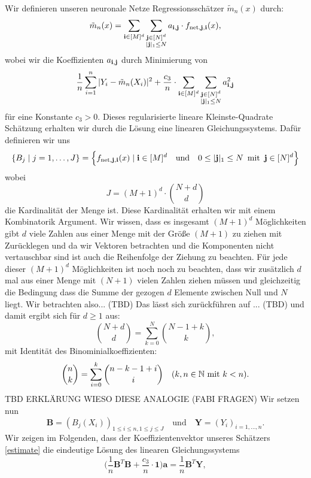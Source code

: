 Wir definieren unseren neuronale Netze Regressionsschätzer $\tilde{m}_n(x)$ durch$\colon$
\begin{equation}
\label{estimate}
\tilde{m}_n(x) = \sum_{\mathbf{i} \in [M]^d} \sum_{\substack{\mathbf{j} \in [N]^d\\|\mathbf{j}|_1 \leq N}} a_{\mathbf{i},\mathbf{j}} \cdot f_{\mathrm{net},\mathbf{j},\mathbf{i}}(x),
\end{equation}
wobei wir die Koeffizienten $a_{\mathbf{i},\mathbf{j}}$ durch Minimierung von 
\begin{equation}
\label{min} \frac{1}{n} \sum_{i = 1}^n|Y_i - \tilde{m}_n(X_i)|^2 + \frac{c_3}{n} \cdot \sum_{\mathbf{i} \in [M]^d} \sum_{\substack{\mathbf{j} \in [N]^d\\|\mathbf{j}|_1 \leq N}} a_{\mathbf{i},\mathbf{j}}^2
\end{equation}
für eine Konstante $c_3 > 0.$ Dieses regularisierte lineare Kleinste-Quadrate Schätzung erhalten wir durch die Lösung eine linearen Gleichungssystems. Dafür definieren wir uns 
\begin{align*} 
\{B_j \mid j = 1,\dots,J\} = \Bigl\{f_{\mathrm{net},\mathbf{j},\mathbf{i}}(x) \mid \mathbf{i} \in [M]^d \quad \text{und} \quad 0 \leq |\mathbf{j}|_1 \leq N \, \text{ mit }\, \mathbf{j} \in [N]^d \Bigr\}
\end{align*}
wobei
$$ J = (M + 1)^d \cdot \binom{N + d}{d}$$ die Kardinalität der Menge ist.
Diese Kardinalität erhalten wir mit einem Kombinatorik Argument.
Wir wissen, dass es insgesamt $(M + 1)^d$ Möglichkeiten gibt $d$ viele Zahlen aus einer Menge mit der Größe $(M + 1)$ zu ziehen mit Zurücklegen und da wir Vektoren betrachten und die Komponenten nicht vertauschbar sind ist auch die Reihenfolge der Ziehung zu beachten.
Für jede dieser $(M + 1)^d$ Möglichkeiten ist noch noch zu beachten, dass wir zusätzlich $d$ mal aus einer Menge mit $(N + 1)$ vielen Zahlen ziehen müssen und gleichzeitig die Bedingung dass die Summe der gezogen $d$ Elemente zwischen Null und $N$ liegt.
Wir betrachten also... (TBD)
Das lässt sich zurückführen auf ... (TBD) und damit ergibt sich für $d \geq 1$ aus: 
$$\binom{N + d}{d} = \sum_{k = 0}^N \binom{N - 1 + k}{k},$$
mit Identität des Binominialkoeffizienten:
$$\binom{n}{k} = \sum_{i = 0}^k \binom{n - k - 1 + i}{i} \quad (k, n \in \mathbb{N}  \text{ mit  } k < n).$$
TBD ERKLÄRUNG WIESO DIESE ANALOGIE (FABI FRAGEN)
Wir setzen nun 
$$ \mathbf{B} = (B_j(X_i))_{1\leq i \leq n,1\leq j \leq J} \quad \text{und} \quad \mathbf{Y} = (Y_i)_{i = 1,\dots,n}.$$
Wir zeigen im Folgenden, dass der Koeffizientenvektor unseres Schätzers \ref{estimate} die eindeutige Lösung des linearen Gleichungssystems 
\begin{equation}
\label{les}
\bigg(\frac{1}{n}\mathbf{B}^T\mathbf{B} + \frac{c_3}{n} \cdot \mathbf{1} \bigg) \mathbf{a} = \frac{1}{n} \mathbf{B}^T\mathbf{Y},
\end{equation}
